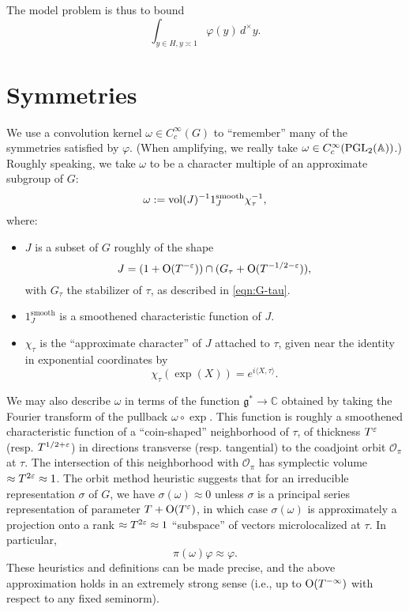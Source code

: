 \documentclass[reqno]{amsart} 
\numberwithin{equation}{section}
\numberwithin{theorem}{section}
\begin{document}
The model problem is thus to bound
\begin{equation}\label{eq:int-_y-in}
  \int _{y \in H, y \asymp 1} \varphi(y) \, d^\times y.
\end{equation}

\section{Symmetries}\label{sec:org1580512}
We use a convolution kernel $\omega \in C_c^\infty(G)$ to ``remember'' many of the symmetries satisfied by $\varphi$.  (When amplifying, we really take $\omega \in C_c^\infty(\operatorname{PGL}_2(\mathbb{A}))$.)  Roughly speaking, we take $\omega$ to be a character multiple of an approximate subgroup of $G$:
\begin{equation*}
  \omega := \operatorname{vol}(J)^{-1} 1_J^{\text{smooth}} \chi_\tau^{-1},
\end{equation*}
where:
\begin{itemize}
\item $J$ is a subset of $G$ roughly of the shape
  \begin{equation*}
    J = (1 + \operatorname{O}(T^{-\varepsilon})) \cap (G_\tau + \operatorname{O}(T^{-1/2-\varepsilon})),
  \end{equation*}
  with $G_\tau$ the stabilizer of $\tau$, as described in \eqref{eqn:G-tau}.
\item $1_J^{\text{smooth}}$ is a smoothened characteristic function of $J$.
\item $\chi_\tau$ is the ``approximate character'' of $J$ attached to $\tau$, given near the identity in exponential coordinates by
  \begin{equation*}
    \chi_\tau(\exp(X)) = e^{i \langle X, \tau \rangle}.
  \end{equation*}  
\end{itemize}

We may also describe $\omega$ in terms of the function $\mathfrak{g}^* \rightarrow \mathbb{C}$ obtained by taking the Fourier transform of the pullback $\omega \circ \exp$.  This function is roughly a smoothened characteristic function of a ``coin-shaped'' neighborhood of $\tau$, of thickness $T^\varepsilon$ (resp. $T^{1/2+\varepsilon}$) in directions transverse (resp. tangential) to the coadjoint orbit $\mathcal{O}_\pi$ at $\tau$.  The intersection of this neighborhood with $\mathcal{O}_\pi$ has symplectic volume $\approx T^{2 \varepsilon} \approx 1$.  The orbit method heuristic suggests that for an irreducible representation $\sigma$ of $G$, we have $\sigma(\omega) \approx 0$ unless $\sigma$ is a principal series representation of parameter $T + \operatorname{O}(T^{\varepsilon})$, in which case $\sigma(\omega)$ is approximately a projection onto a rank $\approx T^{2 \varepsilon} \approx 1$ ``subspace'' of vectors microlocalized at $\tau$.  In particular,
\begin{equation}\label{eqn:35ac3e34eb}
  \pi(\omega) \varphi \approx \varphi.
\end{equation}
These heuristics and definitions can be made precise, and the above approximation holds in an extremely strong sense (i.e., up to $\operatorname{O}(T^{-\infty})$ with respect to any fixed seminorm).
\end{document}
